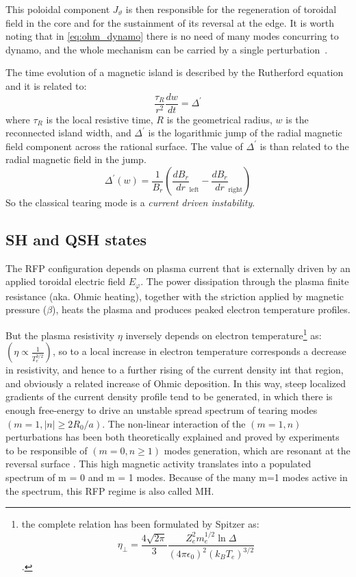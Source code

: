 This poloidal component $J_\vartheta$ is then responsible for the regeneration of toroidal field in the core and for the sustainment of its reversal at the edge. It is worth noting that in \eqref{eq:ohm_dynamo} there is no need of many modes concurring to dynamo, and the whole mechanism can be carried by a single perturbation~\cite{Bonomo39}.


The time evolution of a magnetic island is described by the Rutherford equation and it is related to:
\begin{equation}
    \frac{\tau_R}{r^2} \frac{dw}{dt} = \Delta^\prime
\end{equation}
%
where $\tau_R$ is the local resistive time, $R$ is the geometrical radius, $w$ is the reconnected island width, and $\Delta^\prime$ is the logarithmic jump of the radial magnetic field component across the rational surface.
%
The value of $\Delta^\prime$ is than related to the radial magnetic field in the jump.
\begin{equation}
    \Delta^\prime (w) = \frac{1}{B_r} \left( \frac{dB_r}{dr}_\text{left} - \frac{dB_r}{dr}_\text{right} \right)
\end{equation}
%	
So the classical tearing mode is a {\em current driven instability}.

\subsection{SH and QSH states}

The RFP configuration depends on plasma current that is externally driven by an applied toroidal electric field $E_\varphi$. The
power dissipation through the plasma finite resistance (aka. Ohmic heating), together with the striction applied by magnetic pressure ($\beta$), heats the plasma and produces peaked electron temperature profiles. 

But the plasma resistivity $\eta$ inversely depends on electron temperature\footnote{the complete relation has been formulated by Spitzer as: $$\eta_\bot  = \frac{4\sqrt{2\pi}}{3} \frac{Z_e^2 m_e^{1/2} \ln{\Delta}}{(4\pi\epsilon_0)^2(k_B T_e)^{3/2}} $$.}
as: $(\eta \propto \frac{1}{T_e^{3/2}})$, so to a local increase in electron temperature corresponds a decrease in resistivity, and hence to a further rising of the current density int that region, and obviously a related increase of Ohmic deposition. In this way, steep localized gradients of the current density profile tend to be generated, in which there is enough free-energy to drive an unstable spread spectrum of tearing modes $(m = 1, |n| \geq 2R_0 /a)$. The non-linear interaction of the $(m = 1, n)$ perturbations has been both theoretically explained and proved by experiments to be responsible of $(m = 0, n \geq 1)$ modes generation, which are resonant at the reversal surface \cite{Bonomo33}. This high magnetic activity translates into a populated spectrum of m = 0 and m = 1 modes.
Because of the many m=1 modes active in the spectrum, this RFP regime is also called \acl{MH}.

